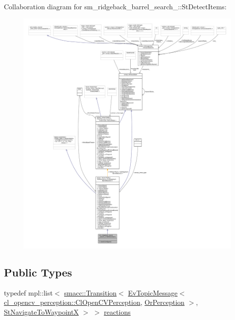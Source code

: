 Collaboration diagram for sm\+\_\+ridgeback\+\_\+barrel\+\_\+search\+\_\+:\+:St\+Detect\+Items\+:
\nopagebreak
\begin{figure}[H]
\begin{center}
\leavevmode
\includegraphics[width=350pt]{structsm__ridgeback__barrel__search__2_1_1StDetectItems__coll__graph}
\end{center}
\end{figure}
\subsection*{Public Types}
\begin{DoxyCompactItemize}
\item 
typedef mpl\+::list$<$ \hyperlink{classsmacc_1_1Transition}{smacc\+::\+Transition}$<$ \hyperlink{structsmacc_1_1default__events_1_1EvTopicMessage}{Ev\+Topic\+Message}$<$ \hyperlink{classsm__ridgeback__barrel__search__2_1_1cl__opencv__perception_1_1ClOpenCVPerception}{cl\+\_\+opencv\+\_\+perception\+::\+Cl\+Open\+C\+V\+Perception}, \hyperlink{classsm__ridgeback__barrel__search__2_1_1OrPerception}{Or\+Perception} $>$, \hyperlink{structsm__ridgeback__barrel__search__2_1_1StNavigateToWaypointX}{St\+Navigate\+To\+WaypointX} $>$ $>$ \hyperlink{structsm__ridgeback__barrel__search__2_1_1StDetectItems_aaa9b572bf0f272f0170bb5fcef3ed887}{reactions}
\end{DoxyCompactItemize}
